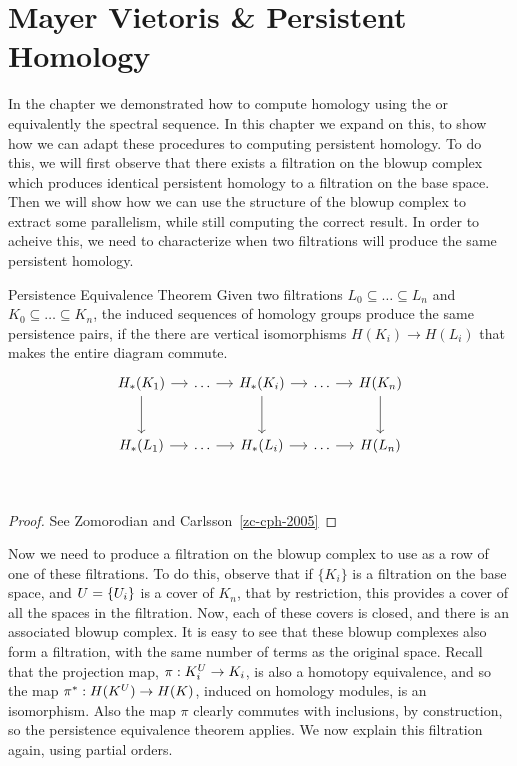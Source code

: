 \chapter{Mayer Vietoris \& Persistent Homology}
In the chapter we demonstrated how to compute homology using the \mvb{} or equivalently the \mv spectral sequence. In this chapter we expand on this, to show how we can adapt these procedures to computing persistent homology. To do this, we will first observe that there exists a filtration on the blowup complex which produces identical persistent homology to a filtration on the base space. Then we will show how we can use the structure of the blowup complex to extract some parallelism, while still computing the correct result. In order to acheive this, we need to characterize when two filtrations will produce the same persistent homology. 
\begin{theorem}{Persistence Equivalence Theorem}
    Given two filtrations $L_0 \subseteq \ldots \subseteq L_n$ and
    $K_0 \subseteq \ldots \subseteq K_n$, the induced sequences of homology
    groups produce the same persistence pairs,
    if the there are vertical isomorphisms $H(K_i) \to H(L_i)$ that makes the entire diagram commute.
\[
\begin{tikzcd}[row sep=large, column sep=small]
    H_*(K_1) \arrow{r}\arrow{d} & \ldots \arrow{r} & H_*(K_i)  \arrow{r}\arrow{d} & \ldots \arrow{r} & H(K_n) \arrow{d} \\
    H_*(L_1) \arrow{r} & \ldots \arrow{r} & H_*(L_i)  \arrow{r} & \ldots \arrow{r} & H(L_n) \\
\end{tikzcd}
\]
\end{theorem}
\begin{proof}
See Zomorodian and Carlsson~\ref{zc-cph-2005}
\end{proof}
Now we need to produce a filtration on the blowup complex to use as a row of one of these filtrations. To do this, observe that if $\{K_i\}$ is a filtration on the base space, and $U =\{ U_i \}$ is a cover of $K_n$, that by restriction, this provides a cover of all the spaces in the filtration. Now, each of these covers is closed, and there is an associated blowup complex. It is easy to see that these blowup complexes also form a filtration, with the same number of terms as the original space. Recall that the projection map, $\pi: K_i^U \to K_i$, is also a homotopy equivalence, and so the map $\pi^*: H(K^U) \to H(K)$, induced on homology modules, is an isomorphism. Also the map $\pi$ clearly commutes with inclusions, by construction, so  the persistence equivalence theorem applies. We now explain this filtration again, using partial orders.


